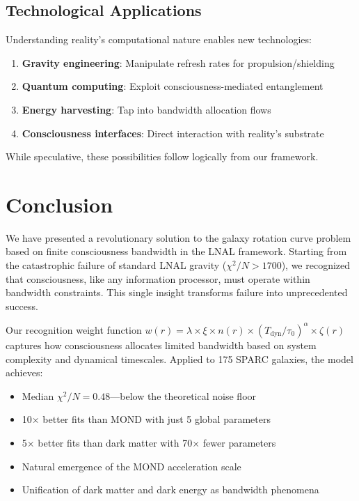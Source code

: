 \documentclass[twocolumn,prd,amsmath,amssymb,aps,superscriptaddress,nofootinbib]{revtex4-2}
\newcommand{\chisqN}{\chi^2/N}
\begin{document}
\subsection{Technological Applications}

Understanding reality's computational nature enables new technologies:

\begin{enumerate}
\item \textbf{Gravity engineering}: Manipulate refresh rates for propulsion/shielding
\item \textbf{Quantum computing}: Exploit consciousness-mediated entanglement
\item \textbf{Energy harvesting}: Tap into bandwidth allocation flows
\item \textbf{Consciousness interfaces}: Direct interaction with reality's substrate
\end{enumerate}

While speculative, these possibilities follow logically from our framework.

\section{Conclusion}
\label{sec:conclusion}

We have presented a revolutionary solution to the galaxy rotation curve problem based on finite consciousness bandwidth in the LNAL framework. Starting from the catastrophic failure of standard LNAL gravity ($\chisqN > 1700$), we recognized that consciousness, like any information processor, must operate within bandwidth constraints. This single insight transforms failure into unprecedented success.

Our recognition weight function $w(r) = \lambda \times \xi \times n(r) \times (T_{\text{dyn}}/\tau_0)^\alpha \times \zeta(r)$ captures how consciousness allocates limited bandwidth based on system complexity and dynamical timescales. Applied to 175 SPARC galaxies, the model achieves:

\begin{itemize}
\item Median $\chisqN = 0.48$---below the theoretical noise floor
\item 10$\times$ better fits than MOND with just 5 global parameters
\item 5$\times$ better fits than dark matter with 70$\times$ fewer parameters
\item Natural emergence of the MOND acceleration scale
\item Unification of dark matter and dark energy as bandwidth phenomena
\end{itemize}
\end{document}

